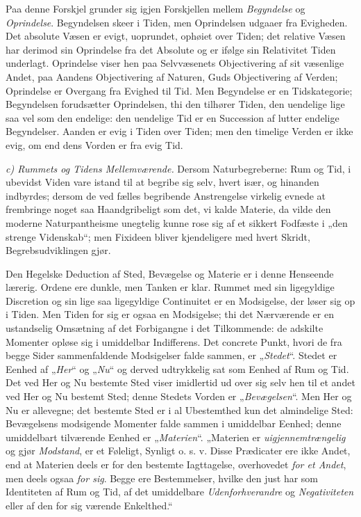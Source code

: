 \documentclass[12pt,a4paper]{book}
\newcommand{\runin}[1]{\emph{#1}\hspace{0.4em}}
\begin{document}
Paa denne Forskjel grunder sig igjen Forskjellen mellem
\emph{Begyndelse} og \emph{Oprindelse}. Begyndelsen skeer i Tiden, men
Oprindelsen udgaaer fra Evigheden. Det absolute Væsen er evigt,
uoprundet, ophøiet over Tiden; det relative Væsen har derimod sin
Oprindelse fra det Absolute og er ifølge sin Relativitet Tiden
underlagt. Oprindelse viser hen paa Selvvæsenets Objectivering af sit
væsenlige Andet, paa Aandens Objectivering af Naturen, Guds
Objectivering af Verden; Oprindelse er Overgang fra Evighed til Tid.
Men Begyndelse er en Tidskategorie; Begyndelsen forudsætter
Oprindelsen, thi den tilhører Tiden, den uendelige lige saa vel som den
endelige: den uendelige Tid er en Succession af lutter endelige
Begyndelser. Aanden er evig i Tiden over Tiden; men den timelige
Verden er ikke evig, om end dens Vorden er fra evig Tid.

\runin{c) Rummets og Tidens Mellemværende.} Dersom Naturbegreberne:
Rum og Tid, i ubevidst Viden vare istand til at begribe sig selv, hvert
især, og hinanden indbyrdes; dersom de ved fælles begribende
Anstrengelse virkelig evnede at frembringe noget saa Haandgribeligt som
det, vi kalde Materie, da vilde den moderne Naturpantheisme unegtelig
kunne rose sig af et sikkert Fodfæste i „den strenge Videnskab“; men
Fixideen bliver kjendeligere med hvert Skridt, Begrebsudviklingen gjør.

Den Hegelske Deduction af Sted, Bevægelse og Materie er i denne
Henseende lærerig. Ordene ere dunkle, men Tanken er klar. Rummet med
sin ligegyldige Discretion og sin lige saa ligegyldige Continuitet er
en Modsigelse, der løser sig op i Tiden. Men Tiden for sig er ogsaa en
Modsigelse; thi det Nærværende er en ustandselig Omsætning af det
Forbigangne i det Tilkommende: de adskilte Momenter opløse sig i
umiddelbar Indifferens. Det concrete Punkt, hvori de fra begge Sider
sammenfaldende Modsigelser falde sammen, er „\emph{Stedet}“. Stedet er
Eenhed af „\emph{Her}“ og „\emph{Nu}“ og derved udtrykkelig sat som
Eenhed af Rum og Tid. Det ved Her og Nu bestemte Sted viser imidlertid
ud over sig selv hen til et andet ved Her og Nu bestemt Sted; denne
Stedets Vorden er „\emph{Bevægelsen}“. Men Her og Nu er allevegne; det
bestemte Sted er i al Ubestemthed kun det almindelige Sted:
Bevægelsens modsigende Momenter falde sammen i umiddelbar Eenhed;
denne umiddelbart tilværende Eenhed er „\emph{Materien}“. „Materien er
\emph{uigjennemtrængelig} og gjør \emph{Modstand}, er et Føleligt,
Synligt o. s. v. Disse Prædicater ere ikke Andet, end at Materien
deels er for den bestemte Iagttagelse, overhovedet \emph{for et Andet},
men deels ogsaa \emph{for sig}. Begge ere Bestemmelser, hvilke den
just har som Identiteten af Rum og Tid, af det umiddelbare
\emph{Udenforhverandre} og \emph{Negativiteten} eller af den for sig
værende Enkelthed.“
\end{document}
